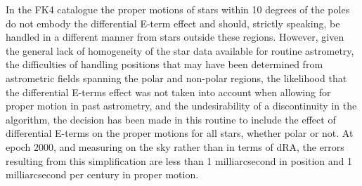 \documentclass[twoside,11pt,nolof]{starlink}
\begin{document}
{{{         \sstitem
          In the FK4 catalogue the proper motions of stars within 10
         degrees of the poles do not embody the differential E-term effect
         and should, strictly speaking, be handled in a different manner
         from stars outside these regions. However, given the general lack
         of homogeneity of the star data available for routine astrometry,
         the difficulties of handling positions that may have been
         determined from astrometric fields spanning the polar and non-polar
         regions, the likelihood that the differential E-terms effect was not
         taken into account when allowing for proper motion in past
         astrometry, and the undesirability of a discontinuity in the
         algorithm, the decision has been made in this routine to include the
         effect of differential E-terms on the proper motions for all stars,
         whether polar or not.  At epoch 2000, and measuring on the sky rather
         than in terms of dRA, the errors resulting from this simplification
         are less than 1 milliarcsecond in position and 1 milliarcsecond per
         century in proper motion.
      }
   }
}
\end{document}
